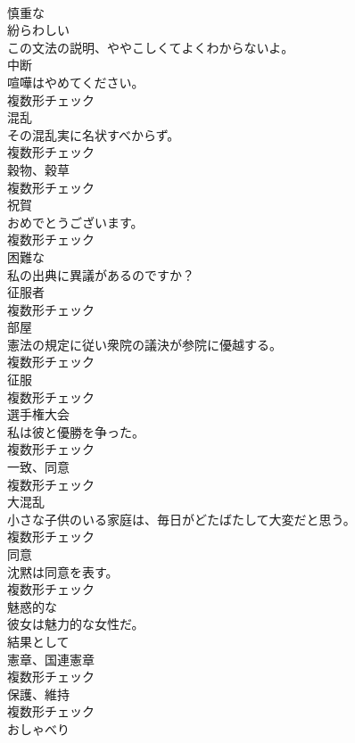 \documentclass[8pt]{extreport}
\begin{document}
\begin{CJK}{UTF8}{min}
\\	[形容詞]	慎重な	
\\	[形容詞]	紛らわしい	
\\	この文法の説明、ややこしくてよくわからないよ。	
\\	[名詞]	中断	
\\	喧嘩はやめてください。	
\\	複数形チェック
\\	[名詞]	混乱	
\\	その混乱実に名状すべからず。	
\\	複数形チェック
\\	[名詞]	穀物、穀草	
\\	複数形チェック
\\	[名詞]	祝賀	
\\	おめでとうございます。	
\\	複数形チェック
\\	[形容詞]	困難な	
\\	私の出典に異議があるのですか？	
\\	[名詞]	征服者	
\\	複数形チェック
\\	[名詞]	部屋	
\\	憲法の規定に従い衆院の議決が参院に優越する。	
\\	複数形チェック
\\	[名詞]	征服	
\\	複数形チェック
\\	[名詞]	選手権大会	
\\	私は彼と優勝を争った。	
\\	複数形チェック
\\	[名詞]	一致、同意	
\\	複数形チェック
\\	[名詞]	大混乱	
\\	小さな子供のいる家庭は、毎日がどたばたして大変だと思う。	
\\	複数形チェック
\\	[名詞]	同意	
\\	沈黙は同意を表す。	
\\	複数形チェック
\\	[形容詞]	魅惑的な	
\\	彼女は魅力的な女性だ。	
\\	[副詞]	結果として	
\\	[名詞]	憲章、国連憲章	
\\	複数形チェック
\\	[名詞]	保護、維持	
\\	複数形チェック
\\	[名詞]	おしゃべり	

\end{CJK}
\end{document}
